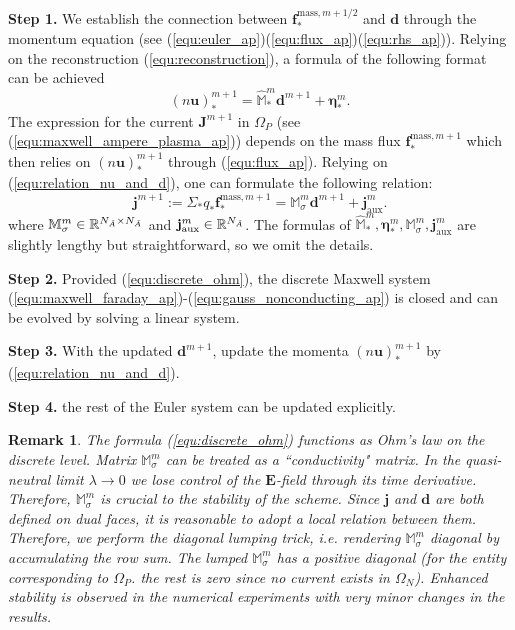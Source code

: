 \documentclass{article}
\newtheorem*{remark}{Remark}
\begin{document}
\noindent \textbf{Step 1.} We establish the connection between $\mathbf{f}^{\text{mass},m+1/2}_*$ and $\mathbf{d}$ through the momentum equation (see (\ref{equ:euler_ap})(\ref{equ:flux_ap})(\ref{equ:rhs_ap})). Relying on the reconstruction (\ref{equ:reconstruction}), a formula of the following format can be achieved
\begin{equation} \label{equ:relation_nu_and_d}
    (n\mathbf{u})_*^{m+1} = \hat{\mathbb{M}}^m_* \mathbf{d}^{m+1} + \bm{\eta}_*^m. 
\end{equation}
The expression for the current $\mathbf{J}^{m+1}$ in $\Omega_P$ (see (\ref{equ:maxwell_ampere_plasma_ap})) depends on the mass flux $\bm{f}^{\text{mass},{m+1}}_*$ which then relies on $(n\mathbf{u})_*^{m+1}$ through (\ref{equ:flux_ap}). Relying on (\ref{equ:relation_nu_and_d}), one can formulate the following relation:
\begin{equation} \label{equ:discrete_ohm}
    \mathbf{j}^{m+1} := \Sigma_\ast q_\ast \bm{f}^{\text{mass},m+1}_\ast = \mathbb{M}_\sigma^{m} \mathbf{d}^{m+1} + \mathbf{j}^m_{\text{aux}}.
\end{equation}
where $\mathbb{M}^m_\sigma \in \mathbb{R}^{N_{\Tilde{A}} \times N_{\Tilde{A}}}$ and $\mathbf{j}^m_{\text{aux}} \in \mathbb{R}^{N_{\Tilde{A}}}$.
The formulas of $\hat{\mathbb{M}}_*^m, \bm{\eta}_*^m, \mathbb{M}_\sigma^m, \mathbf{j}^m_{\text{aux}}$ are slightly lengthy but straightforward, so we omit the details. 

\noindent \textbf{Step 2.} Provided (\ref{equ:discrete_ohm}), the discrete Maxwell system (\ref{equ:maxwell_faraday_ap})-(\ref{equ:gauss_nonconducting_ap}) is closed and can be evolved by solving a linear system. 

\noindent \textbf{Step 3.} With the updated $\mathbf{d}^{m+1}$, update the momenta $(n\mathbf{u})^{m+1}_*$ by (\ref{equ:relation_nu_and_d}).

\noindent \textbf{Step 4.} the rest of the Euler system can be updated explicitly.


\begin{remark}
    The formula (\ref{equ:discrete_ohm}) functions as Ohm's law on the discrete level. Matrix $\mathbb{M}_\sigma^m$ can be treated as a ``conductivity" matrix. In the quasi-neutral limit $\lambda \rightarrow 0$ we lose control of the $\mathbf{E}$-field through its time derivative. Therefore, $\mathbb{M}_\sigma^m$ is crucial to the stability of the scheme. Since $\mathbf{j}$ and $\mathbf{d}$ are both defined on dual faces, it is reasonable to adopt a local relation between them. Therefore, we perform the \emph{diagonal lumping} trick, i.e. rendering $\mathbb{M}_\sigma^m$ diagonal by accumulating the row sum. The lumped $\mathbb{M}_\sigma^m$ has a positive diagonal (for the entity corresponding to $\Omega_P$. the rest is zero since no current exists in $\Omega_N$). Enhanced stability is observed in the numerical experiments with very minor changes in the results.
\end{remark}
\end{document}
